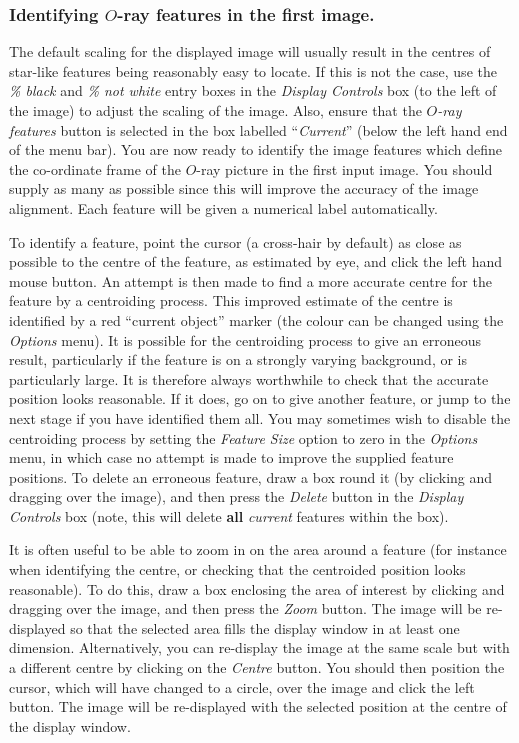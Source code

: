 \documentclass[11pt]{article}
\newcommand{\htmlref}[2]{#1}
\begin{document}
\subsubsection {Identifying $O$-ray features in the first image.}
The default scaling for the displayed image will usually result in the
centres of star-like features being reasonably easy to locate. If this is
not the case, use the \htmlref{\emph{\% black}}{POLKA_BLACK} and
\htmlref{\emph{\% not white}}{POLKA_NOT_WHITE} entry boxes
in the \htmlref{\emph{Display Controls}}{POLKA_DISPLAY_CONTROLS} box
(to the left of the image) to adjust the scaling of the image. Also,
ensure that the \emph{$O$-ray features} button is selected in the box
labelled ``\htmlref{\emph{Current}}{POLKA_CURRENT}'' (below the left hand
end of the menu bar). You are now ready to identify the image features
which define the co-ordinate frame of the $O$-ray picture in the first
input image. You should supply as many as possible since this will
improve the accuracy of the image alignment. Each feature will be given a
numerical label automatically.

To identify a feature, point the cursor (a cross-hair by default) as
close as possible to the centre of the feature, as estimated by eye, and
click the left hand mouse button. An attempt is then made to find a more
accurate centre for the feature by a centroiding process. This improved
estimate of the centre is identified by a red ``current object'' marker
(the colour can be changed using the \htmlref{{\em
Options}}{POLKA_OPTIONS_MENU} menu). It is possible for the centroiding
process to give an erroneous result, particularly if the feature is on a
strongly varying background, or is particularly large. It is therefore
always worthwhile to check that the accurate position looks reasonable.
If it does, go on to give another feature, or jump to the next stage if
you have identified them all. You may sometimes wish to disable the
centroiding process by setting the \htmlref{\emph{Feature
Size}}{POLKA_FEATURE_SIZE} option to zero in the \htmlref{{\em
Options}}{POLKA_OPTIONS_MENU} menu, in which case no attempt is made to
improve the supplied feature positions. To delete an erroneous feature,
draw a box round it (by clicking and dragging over the image), and then
press the \htmlref{\emph{Delete}}{POLKA_DELETE} button in the {\em
Display Controls} box (note, this will delete {\bf all} \emph{current}
features within the box).

It is often useful to be able to zoom in on the area around a feature
(for instance when identifying the centre, or checking that the
centroided position looks reasonable). To do this, draw a box enclosing
the area of interest by clicking and dragging over the image, and then
press the \htmlref{\emph{Zoom}}{POLKA_ZOOM} button. The image will be
re-displayed so that the selected area fills the display window in at
least one dimension. Alternatively, you can re-display the image at the
same scale but with a different centre by clicking on the \htmlref{{\em
Centre}}{POLKA_CENTRE} button. You should then position the cursor,
which will have changed to a circle, over the image and click the
left button. The image will be re-displayed with the selected position at
the centre of the display window.
\end{document}
